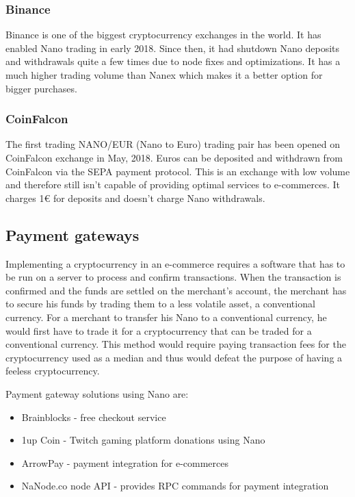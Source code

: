 \documentclass{ferseminar}
\begin{document}
\subsubsection{Binance}
Binance is one of the biggest cryptocurrency exchanges in the world. It has enabled Nano trading in early 2018. Since then, it had shutdown Nano deposits and withdrawals quite a few times due to node fixes and optimizations. It has a much higher trading volume than Nanex which makes it a better option for bigger purchases.

\subsubsection{CoinFalcon}
The first trading NANO/EUR (Nano to Euro) trading pair has been opened on CoinFalcon exchange in May, 2018. Euros can be deposited and withdrawn from CoinFalcon via the SEPA payment protocol. This is an exchange with low volume and therefore still isn't capable of providing optimal services to e-commerces. It charges 1€ for deposits and doesn't charge Nano withdrawals. 
 
\subsection{Payment gateways}
Implementing a cryptocurrency in an e-commerce requires a software that has to be run on a server to process and confirm transactions. When the transaction is confirmed and the funds are settled on the merchant's account, the merchant has to secure his funds by trading them to a less volatile asset, a conventional currency. For a merchant to transfer his Nano to a conventional currency, he would first have to trade it for a cryptocurrency that can be traded for a conventional currency. This method would require paying transaction fees for the cryptocurrency used as a median and thus would defeat the purpose of having a feeless cryptocurrency. 

Payment gateway solutions using Nano are:
\begin{itemize}
	\item Brainblocks -  free checkout service
	\item 1up Coin - Twitch gaming platform donations using Nano
	\item ArrowPay - payment integration for e-commerces
	\item NaNode.co node API - provides RPC commands for payment integration
\end{itemize}
\end{document}
